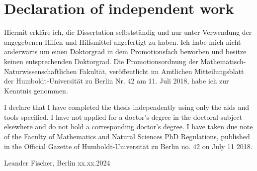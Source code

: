 \chapter*{Declaration of independent work}

Hiermit erkläre ich, die Dissertation selbstständig und nur unter Verwendung der angegebenen Hilfen und Hilfsmittel angefertigt zu haben. Ich habe mich nicht anderwärts um einen Doktorgrad in dem Promotionsfach beworben und besitze keinen entsprechenden Doktorgrad. Die Promotionsordnung der Mathematisch-Naturwissenschaftlichen Fakultät, veröffentlicht im Amtlichen Mitteilungsblatt der Humboldt-Universität zu Berlin Nr. 42 am 11. Juli 2018, habe ich zur Kenntnis genommen.

I declare that I have completed the thesis independently using only the aids and tools specified. I have not applied for a doctor's degree in the doctoral subject elsewhere and do not hold a corresponding doctor's degree. I have taken due note of the Faculty of Mathematics and Natural Sciences PhD Regulations, published in the Official Gazette of Humboldt-Universität zu Berlin no. 42 on July 11 2018.

\vspace{2cm}

Leander Fischer, Berlin xx.xx.2024